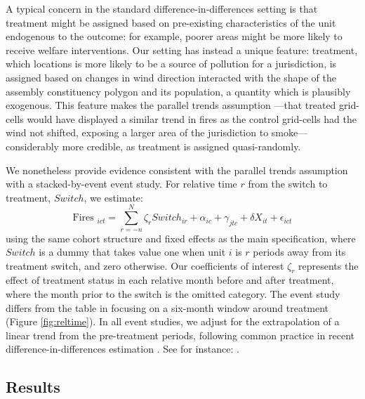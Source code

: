 \documentclass[12pt]{article}
\begin{document}
A typical concern in the standard difference-in-differences setting is that treatment might be assigned based on pre-existing characteristics of the unit endogenous to the outcome: for example, poorer areas might be more likely to receive welfare interventions. Our setting has instead a unique feature: treatment, which locations is more likely to be a source of pollution for a jurisdiction, is assigned based on changes in wind direction interacted with the shape of the assembly constituency polygon and its population, a quantity which is plausibly exogenous. This feature makes the parallel trends assumption  ---that treated grid-cells would have displayed a similar trend in fires as the control grid-cells had the wind not shifted, exposing a larger area of the jurisdiction to smoke--- considerably more credible, as treatment is assigned quasi-randomly. 

We nonetheless provide evidence consistent with the parallel trends assumption with a stacked-by-event event study. For relative time $r$ from the switch to treatment, $Switch$, we estimate:
\begin{equation}\label{eq2}
 \text{Fires }_{ict}= \sum_{r=-n}^{N} \zeta_r Switch_{ir} + \alpha_{ic}+ \gamma_{jtc}+ \delta X_{it} + \epsilon_{ict}
\end{equation}
using the same cohort structure and fixed effects as the main specification, where $Switch$ is a dummy that takes value one when unit $i$ is $r$ periods away from its treatment switch, and zero otherwise. 
Our coefficients of interest $\zeta_r$ represents the effect of treatment status in each relative month before and after treatment, where the month prior to the switch is the omitted category. 
The event study differs from the table in focusing on a six-month window around treatment (Figure \ref{fig:reltime}). In all event studies, we adjust for the extrapolation of a linear trend from the pre-treatment periods, following common practice in recent difference-in-differences estimation \citep[p. 2558]{rambachan2023more}. See for instance: \citet{dobkin2018economic,dustmann2022reallocation,fenizia2024organized}. 


\subsection{Results\label{ssec:results1}}
\end{document}

